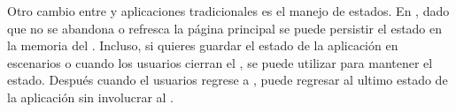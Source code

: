 Otro cambio entre \spa y aplicaciones \web tradicionales es el manejo de estados. En \spa, dado que no se abandona o refresca la página \web principal se puede persistir el estado en la memoria del \browser. Incluso, si quieres guardar el estado de la aplicación en escenarios \offline o cuando los usuarios cierran el \browser, se puede utilizar \htmlfive \storage para mantener el estado. Después cuando el usuarios regrese a \online, puede regresar al ultimo estado de la aplicación sin involucrar al \server.

